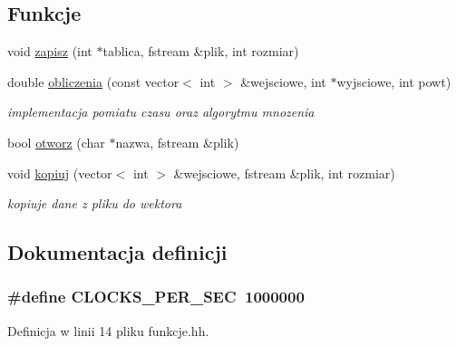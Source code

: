 \subsection*{\-Funkcje}
\begin{DoxyCompactItemize}
\item 
void \hyperlink{funkcje_8hh_aaa6c62fc60fb1173b904269379d69754}{zapisz} (int $\ast$tablica, fstream \&plik, int rozmiar)
\item 
double \hyperlink{funkcje_8hh_ad9ebe61e239dee170b242bda4db9ea63}{obliczenia} (const vector$<$ int $>$ \&wejsciowe, int $\ast$wyjsciowe, int powt)
\begin{DoxyCompactList}\small\item\em implementacja pomiatu czasu oraz algorytmu mnozenia \end{DoxyCompactList}\item 
bool \hyperlink{funkcje_8hh_ab80d311fc13e71453f3080482634447e}{otworz} (char $\ast$nazwa, fstream \&plik)
\item 
void \hyperlink{funkcje_8hh_a7eac0a79b677c308c775f4f01aac9a6c}{kopiuj} (vector$<$ int $>$ \&wejsciowe, fstream \&plik, int rozmiar)
\begin{DoxyCompactList}\small\item\em kopiuje dane z pliku do wektora \end{DoxyCompactList}\end{DoxyCompactItemize}


\subsection{\-Dokumentacja definicji}
\hypertarget{funkcje_8hh_a3d9fc3c745d0880902fe3ea3d5d5f71e}{
\subsubsection[{\-C\-L\-O\-C\-K\-S\-\_\-\-P\-E\-R\-\_\-\-S\-E\-C}]{\setlength{\rightskip}{0pt plus 5cm}\#define {\bf \-C\-L\-O\-C\-K\-S\-\_\-\-P\-E\-R\-\_\-\-S\-E\-C}~1000000}}\label{funkcje_8hh_a3d9fc3c745d0880902fe3ea3d5d5f71e}


\-Definicja w linii 14 pliku funkcje.\-hh.



